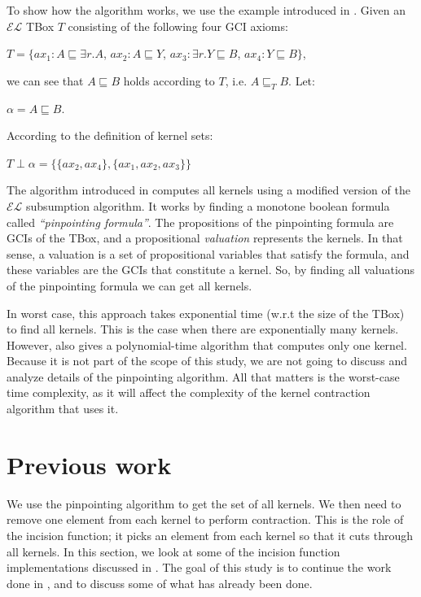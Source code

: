 To show how the algorithm works, we use the example introduced in \cite{pin}. Given an $\mathcal{EL}$ TBox $T$ consisting of the following four GCI axioms:
\begin{center}
$T = \lbrace ax_1: A \sqsubseteq \exists{r}.A$, \hspace{7pt}  $ax_2: A \sqsubseteq Y$,  \hspace{7pt} $ax_3: \exists{r}.Y \sqsubseteq B$, \hspace{7pt} $ax_4: Y \sqsubseteq B \rbrace$,
\end{center}
we can see that $A \sqsubseteq B$ holds according to $T$, i.e. $A \sqsubseteq_T B$. Let: 
\begin{center} 
$\alpha = A \sqsubseteq B$.
\end{center}
According to the definition of kernel sets:
\begin{center}
$T \perp \alpha = \lbrace \lbrace ax_2, ax_4 \rbrace, \lbrace ax_1, ax_2, ax_3 \rbrace \rbrace$
\end{center}
The algorithm introduced in \cite{pin} computes all kernels using a modified version of the $\mathcal{EL}$ subsumption algorithm. It works by finding a monotone boolean formula called \textit{``pinpointing formula''}. The propositions of the pinpointing formula are GCIs of the TBox, and a propositional \textit{valuation} represents the kernels. In that sense, a valuation is a set of propositional variables that satisfy the formula, and these variables are the GCIs that constitute a kernel. So, by finding all valuations of the pinpointing formula we can get all kernels.

In worst case, this approach takes exponential time (w.r.t the size of the TBox) to find all kernels. This is the case when there are exponentially many kernels. However, \cite{pin} also gives a polynomial-time algorithm that computes only one kernel. Because it is not part of the scope of this study, we are not going to discuss and analyze details of the pinpointing algorithm. All that matters is the worst-case time complexity, as it will affect the complexity of the kernel contraction algorithm that uses it.


\section{Previous work}
We use the pinpointing algorithm to get the set of all kernels. We then need to remove one element from each kernel to perform contraction. This is the role of the incision function; it picks an element from each kernel so that it cuts through all kernels.
In this section, we look at some of the incision function implementations discussed in \cite{zwei}. The goal of this study is to continue the work done in \cite{zwei}, and to discuss some of what has already been done. 

